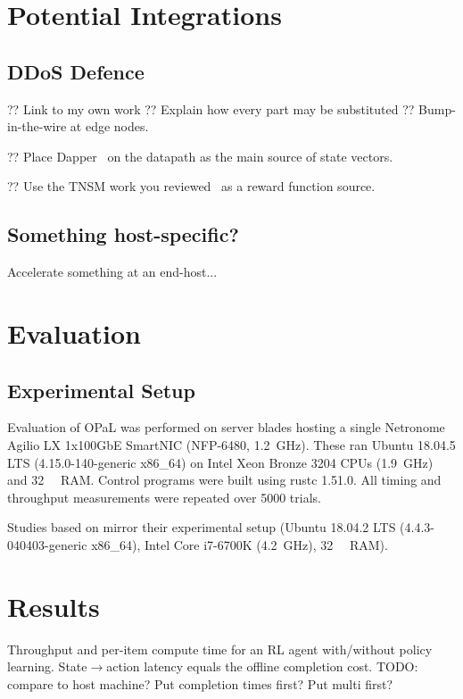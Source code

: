 \documentclass[sigconf,natbib=false]{acmart}
\newcommand{\approachshort}{OPaL}
\begin{document}
\section{Potential Integrations}

\subsection{DDoS Defence}
?? Link to my own work
?? Explain how every part may be substituted
?? Bump-in-the-wire at edge nodes.

?? Place Dapper~\parencite{DBLP:conf/sosr/GhasemiBR17} on the datapath as the main source of state vectors.

?? Use the TNSM work you reviewed~\parencite{tnms-ddos-victim-ident} as a reward function source.

\subsection{Something host-specific?}
Accelerate something at an end-host...

\section{Evaluation}

\subsection{Experimental Setup}
Evaluation of \approachshort{} was performed on server blades hosting a single Netronome Agilio LX 1x100GbE SmartNIC (NFP-6480, \SI{1.2}{\giga\hertz}).
These ran Ubuntu 18.04.5 LTS (4.15.0-140-generic x86\_64) on Intel Xeon Bronze 3204 CPUs (\SI{1.9}{\giga\hertz}) and \SI{32}{\gibi\byte} RAM.
Control programs were built using rustc 1.51.0.
All timing and throughput measurements were repeated over 5000 trials.

Studies based on \textcite{DBLP:journals/tnsm/SimpsonRP20} mirror their experimental setup (Ubuntu 18.04.2 LTS (4.4.3-040403-generic x86\_64), Intel Core i7-6700K (\SI{4.2}{\giga\hertz}), \SI{32}{\gibi\byte} RAM).

\section{Results}

\begin{table}
	\caption{Throughput and per-item compute time for an RL agent with/without policy learning. State$\rightarrow$action latency equals the offline completion cost. TODO: compare to host machine? Put completion times first? Put multi first?}
\end{table}
\end{document}
